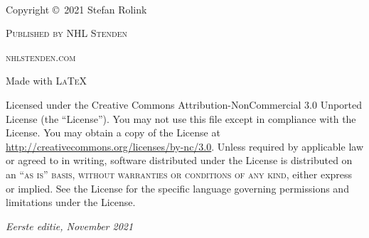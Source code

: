 \documentclass[11pt,fleqn]{book} %
\begin{document}

\begingroup
\thispagestyle{empty} %
\vfill
\endgroup


\newpage
~\vfill
\thispagestyle{empty}

\noindent Copyright \copyright\ 2021 Stefan Rolink %

\noindent \textsc{Published by NHL Stenden} %

\noindent \textsc{nhlstenden.com} %

\noindent Made with \textsc{\LaTeX}

\noindent Licensed under the Creative Commons Attribution-NonCommercial 3.0 Unported License (the ``License''). You may not use this file except in compliance with the License. You may obtain a copy of the License at \url{http://creativecommons.org/licenses/by-nc/3.0}. Unless required by applicable law or agreed to in writing, software distributed under the License is distributed on an \textsc{``as is'' basis, without warranties or conditions of any kind}, either express or implied. See the License for the specific language governing permissions and limitations under the License. %

\noindent \textit{Eerste editie, November 2021} %

\end{document}
